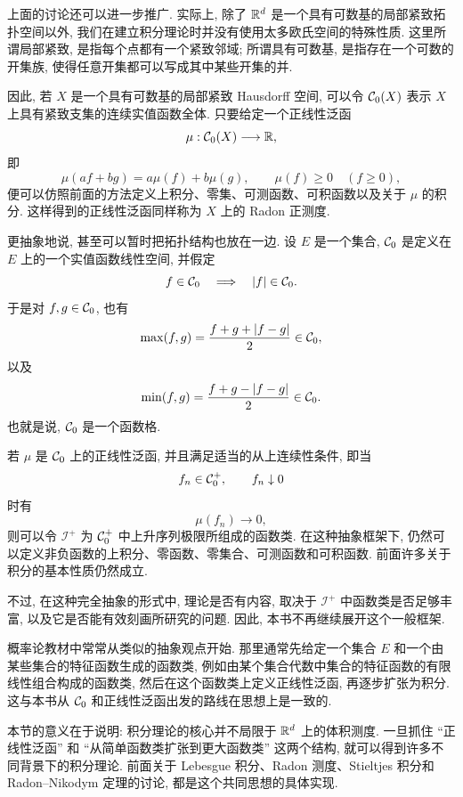 上面的讨论还可以进一步推广. 实际上, 除了 \(\mathbb{R}^d\) 是一个具有可数基的局部紧致拓扑空间以外, 我们在建立积分理论时并没有使用太多欧氏空间的特殊性质. 这里所谓局部紧致, 是指每个点都有一个紧致邻域; 所谓具有可数基, 是指存在一个可数的开集族, 使得任意开集都可以写成其中某些开集的并.

因此, 若 \(X\) 是一个具有可数基的局部紧致 Hausdorff 空间, 可以令 \(\mathcal{C}_0(X)\) 表示 \(X\) 上具有紧致支集的连续实值函数全体. 只要给定一个正线性泛函
\[
\mu:\mathcal{C}_0(X)\longrightarrow\mathbb{R},
\]
即
\[
\mu(af+bg)=a\mu(f)+b\mu(g),
\qquad
\mu(f)\geq0\quad(f\geq0),
\]
便可以仿照前面的方法定义上积分、零集、可测函数、可积函数以及关于 \(\mu\) 的积分. 这样得到的正线性泛函同样称为 \(X\) 上的 Radon 正测度.

更抽象地说, 甚至可以暂时把拓扑结构也放在一边. 设 \(E\) 是一个集合, \(\mathcal{C}_0\) 是定义在 \(E\) 上的一个实值函数线性空间, 并假定
\[
f\in\mathcal{C}_0
\quad\Longrightarrow\quad
|f|\in\mathcal{C}_0.
\]
于是对 \(f,g\in\mathcal{C}_0\), 也有
\[
\max(f,g)=\frac{f+g+|f-g|}{2}\in\mathcal{C}_0,
\]
以及
\[
\min(f,g)=\frac{f+g-|f-g|}{2}\in\mathcal{C}_0.
\]
也就是说, \(\mathcal{C}_0\) 是一个函数格.

若 \(\mu\) 是 \(\mathcal{C}_0\) 上的正线性泛函, 并且满足适当的从上连续性条件, 即当
\[
f_n\in\mathcal{C}_0^+,
\qquad
f_n\downarrow0
\]
时有
\[
\mu(f_n)\to0,
\]
则可以令 \(\mathcal I^+\) 为 \(\mathcal{C}_0^+\) 中上升序列极限所组成的函数类. 在这种抽象框架下, 仍然可以定义非负函数的上积分、零函数、零集合、可测函数和可积函数. 前面许多关于积分的基本性质仍然成立.

不过, 在这种完全抽象的形式中, 理论是否有内容, 取决于 \(\mathcal I^+\) 中函数类是否足够丰富, 以及它是否能有效刻画所研究的问题. 因此, 本书不再继续展开这个一般框架.

\begin{rem}
	概率论教材中常常从类似的抽象观点开始. 那里通常先给定一个集合 \(E\) 和一个由某些集合的特征函数生成的函数类, 例如由某个集合代数中集合的特征函数的有限线性组合构成的函数类, 然后在这个函数类上定义正线性泛函, 再逐步扩张为积分. 这与本书从 \(\mathcal{C}_0\) 和正线性泛函出发的路线在思想上是一致的.
\end{rem}

\begin{rem}
	本节的意义在于说明: 积分理论的核心并不局限于 \(\mathbb{R}^d\) 上的体积测度. 一旦抓住 ``正线性泛函'' 和 ``从简单函数类扩张到更大函数类'' 这两个结构, 就可以得到许多不同背景下的积分理论. 前面关于 Lebesgue 积分、Radon 测度、Stieltjes 积分和 Radon--Nikodym 定理的讨论, 都是这个共同思想的具体实现.
\end{rem}